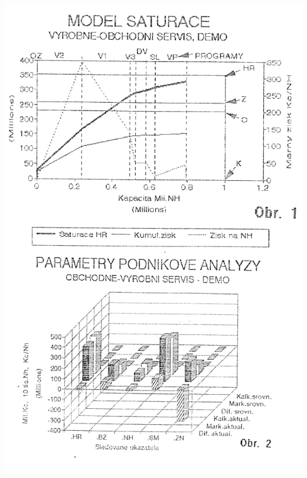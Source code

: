 \documentclass [10pt, fancyhdr, twoside] {article}
\begin{document}
\includegraphics[width=\textwidth,height=\textheight,keepaspectratio]{./saturace-obr.png}
\end{document}
